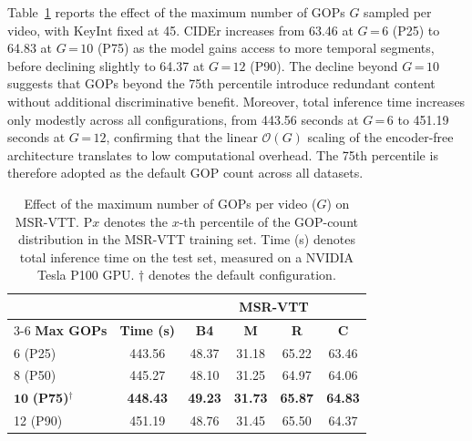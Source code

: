 Table~\ref{tab:exp_max_gops} reports the effect of the maximum number of GOPs $G$ sampled per video, with $\mathrm{KeyInt}$ fixed at 45. CIDEr increases from 63.46 at \mbox{$G\,\texttt{=}\,6$} (P25) to 64.83 at \mbox{$G\,\texttt{=}\,10$} (P75) as the model gains access to more temporal segments, before declining slightly to 64.37 at \mbox{$G\,\texttt{=}\,12$} (P90). The decline beyond $G\,\texttt{=}\,10$ suggests that GOPs beyond the 75th percentile introduce redundant content without additional discriminative benefit. Moreover, total inference time increases only modestly across all configurations, from 443.56 seconds at \mbox{$G\,\texttt{=}\,6$} to 451.19 seconds at \mbox{$G\,\texttt{=}\,12$}, confirming that the linear $\mathcal{O}(G)$ scaling of the encoder-free architecture translates to low computational overhead. The 75th percentile is therefore adopted as the default GOP count across all datasets.

\begin{table}[!t]
\caption{Effect of the maximum number of GOPs per video ($G$) on MSR-VTT. P$x$ denotes the $x$-th percentile of the GOP-count distribution in the MSR-VTT training set. Time (s) denotes total inference time on the test set, measured on a NVIDIA Tesla P100 GPU. $\dagger$ denotes the default configuration.}
\label{tab:exp_max_gops}
\centering
\begin{tabular}{l c cccc}
\hline\hline
 & & \multicolumn{4}{c}{\textbf{MSR-VTT}} \\
\cline{3-6}
\textbf{Max GOPs} & \textbf{Time (s)} & \textbf{B4} & \textbf{M} & \textbf{R} & \textbf{C} \\
\hline
6 (P25) & 443.56 & 48.37 & 31.18 & 65.22 & 63.46 \\
8 (P50) & 445.27 & 48.10 & 31.25 & 64.97 & 64.06 \\
$\mathbf{10}$ \textbf{(P75)}$^\dagger$ & \textbf{448.43} & \textbf{49.23} & \textbf{31.73} & \textbf{65.87} & \textbf{64.83} \\
12 (P90) & 451.19 & 48.76 & 31.45 & 65.50 & 64.37 \\
\hline\hline
\end{tabular}
\end{table}





